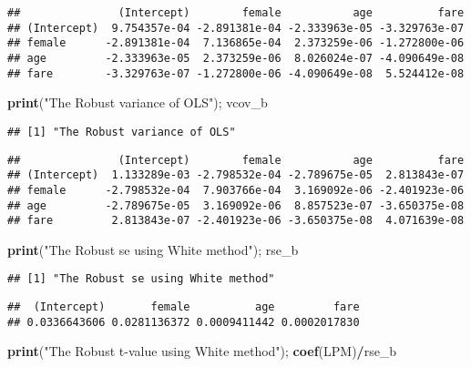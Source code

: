 \documentclass[
  12pt,
]{article}
\newenvironment{Shaded}{\begin{snugshade}}{\end{snugshade}}
\newcommand{\KeywordTok}[1]{\textcolor[rgb]{0.13,0.29,0.53}{\textbf{#1}}}
\newcommand{\NormalTok}[1]{#1}
\newcommand{\OperatorTok}[1]{\textcolor[rgb]{0.81,0.36,0.00}{\textbf{#1}}}
\newcommand{\StringTok}[1]{\textcolor[rgb]{0.31,0.60,0.02}{#1}}
\begin{document}
\begin{verbatim}
##               (Intercept)        female           age          fare
## (Intercept)  9.754357e-04 -2.891381e-04 -2.333963e-05 -3.329763e-07
## female      -2.891381e-04  7.136865e-04  2.373259e-06 -1.272800e-06
## age         -2.333963e-05  2.373259e-06  8.026024e-07 -4.090649e-08
## fare        -3.329763e-07 -1.272800e-06 -4.090649e-08  5.524412e-08
\end{verbatim}

\begin{Shaded}
\begin{Highlighting}[]
\KeywordTok{print}\NormalTok{(}\StringTok{"The Robust variance of OLS"}\NormalTok{); vcov\_b}
\end{Highlighting}
\end{Shaded}

\begin{verbatim}
## [1] "The Robust variance of OLS"
\end{verbatim}

\begin{verbatim}
##               (Intercept)        female           age          fare
## (Intercept)  1.133289e-03 -2.798532e-04 -2.789675e-05  2.813843e-07
## female      -2.798532e-04  7.903766e-04  3.169092e-06 -2.401923e-06
## age         -2.789675e-05  3.169092e-06  8.857523e-07 -3.650375e-08
## fare         2.813843e-07 -2.401923e-06 -3.650375e-08  4.071639e-08
\end{verbatim}

\begin{Shaded}
\begin{Highlighting}[]
\KeywordTok{print}\NormalTok{(}\StringTok{"The Robust se using White method"}\NormalTok{); rse\_b}
\end{Highlighting}
\end{Shaded}

\begin{verbatim}
## [1] "The Robust se using White method"
\end{verbatim}

\begin{verbatim}
##  (Intercept)       female          age         fare 
## 0.0336643606 0.0281136372 0.0009411442 0.0002017830
\end{verbatim}

\begin{Shaded}
\begin{Highlighting}[]
\KeywordTok{print}\NormalTok{(}\StringTok{"The Robust t{-}value using White method"}\NormalTok{); }\KeywordTok{coef}\NormalTok{(LPM)}\OperatorTok{/}\NormalTok{rse\_b}
\end{Highlighting}
\end{Shaded}
\end{document}
